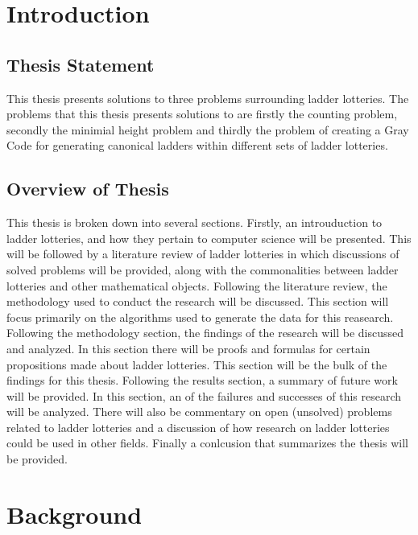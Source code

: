 



\chapter{Introduction}
\label{chapter:intro}



\section{Thesis Statement}  
This thesis presents solutions to three problems surrounding ladder lotteries.
The problems that this thesis presents solutions to are firstly the counting problem, secondly the minimial height problem and thirdly 
the problem of creating a Gray Code for generating canonical ladders within different sets
of ladder lotteries. 
\section{Overview of Thesis}  

This thesis is broken down into several sections. Firstly, an introuduction to ladder
lotteries, and how they pertain to computer science will be presented. This will be followed by a literature 
review of ladder lotteries in which discussions of solved problems will be 
provided, along with the commonalities between ladder lotteries and 
other mathematical objects. Following the literature review, the methodology
used to conduct the research will be discussed. This section will focus 
primarily on the algorithms used to generate the data for this reasearch. 
Following the methodology section, the findings of the research will be discussed and analyzed. In this section
there will be proofs and formulas for certain propositions made about ladder 
lotteries. This section will be the bulk of the findings for this thesis.
Following the results section, a summary of future work will be provided. In this section, an 
of the failures and successes of this research will be analyzed. There will also be commentary on 
open (unsolved) problems related to ladder lotteries and a 
discussion of how research on ladder lotteries could be used in other fields.
Finally a conlcusion that summarizes the thesis will be provided.

\chapter{Background}
\label{chapter:background}
 


